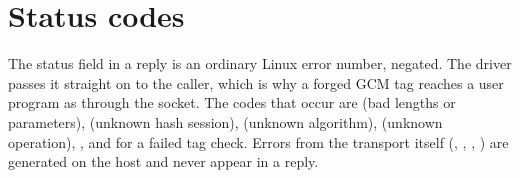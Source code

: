 \section{Status codes}

The status field in a reply is an ordinary Linux error number, negated. The driver passes it straight on to the caller, which is why a forged GCM tag reaches a user program as  through the socket. The codes that occur are  (bad lengths or parameters),  (unknown hash session),  (unknown algorithm),  (unknown operation), , and  for a failed tag check. Errors from the transport itself (, , , ) are generated on the host and never appear in a reply.
